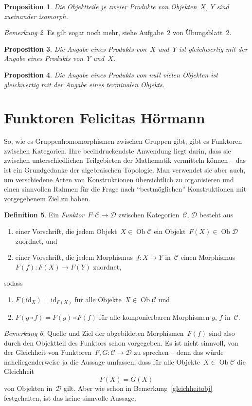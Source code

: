 \documentclass[a4paper,ngerman]{scrartcl}
\theoremstyle{definition}
\newtheorem{defn}{Definition}[section]
\theoremstyle{plain}
\newtheorem{prop}[defn]{Proposition}
\theoremstyle{remark}
\newtheorem{bem}[defn]{Bemerkung}
\newcommand{\C}{\mathcal{C}}
\newcommand{\D}{\mathcal{D}}
\newcommand{\id}{\mathrm{id}}
\DeclareMathOperator{\Ob}{Ob}
\begin{document}
\begin{prop}Die Objektteile je zweier Produkte von Objekten~$X$, $Y$ sind
zueinander isomorph.\end{prop}

\begin{bem}Es gilt sogar noch mehr, siehe Aufgabe~2 von Übungsblatt~2.\end{bem}

\begin{prop}Die Angabe eines Produkts von~$X$ und~$Y$ ist gleichwertig mit der
Angabe eines Produkts von~$Y$ und~$X$.\end{prop}

\begin{prop}Die Angabe eines Produkts von null vielen Objekten ist gleichwertig
mit der Angabe eines terminalen Objekts.\end{prop}


\section[Funktoren]{Funktoren \hfill \small Felicitas Hörmann}

So, wie es Gruppenhomomorphismen zwischen Gruppen gibt, gibt es Funktoren
zwischen Kategorien. Ihre beeindruckendste Anwendung liegt darin, dass sie
zwischen unterschiedlichen Teilgebieten der Mathematik vermitteln können -- das
ist ein Grundgedanke der algebraischen Topologie. Man verwendet sie aber auch,
um verschiedene Arten von Konstruktionen übersichtlich zu organisieren und
einen sinnvollen Rahmen für die Frage nach "`bestmöglichen"' Konstruktionen mit
vorgegebenem Ziel zu haben.

\begin{defn}Ein \emph{Funktor}~$F : \C \to \D$ zwischen Kategorien~$\C$, $\D$
besteht aus
\begin{enumerate}
\item einer Vorschrift, die jedem Objekt~$X \in \Ob \C$ ein Objekt~$F(X) \in \Ob \D$
zuordnet, und
\item einer Vorschrift, die jedem Morphismus~$f:X \to Y$ in~$\C$ einen
Morphismus~$F(f) : F(X) \to F(Y)$ zuordnet,
\end{enumerate}
sodass
\begin{enumerate}
\item $F(\id_X) = \id_{F(X)}$ für alle Objekte~$X \in \Ob \C$ und
\item $F(g \circ f) = F(g) \circ F(f)$ für alle komponierbaren Morphismen $g$, $f$
in~$\C$.
\end{enumerate}
\end{defn}
\begin{bem}Quelle und Ziel der abgebildeten Morphismen~$F(f)$ sind also durch
den Objektteil des Funktors schon vorgegeben. Es ist nicht sinnvoll, von der
Gleichheit von Funktoren~$F,G : \C \to \D$ zu sprechen -- denn das würde
naheliegenderweise ja die Aussage umfassen, dass für alle Objekte~$X \in \Ob \C$ die
Gleichheit
\[ F(X) = G(X) \]
von Objekten in~$\D$ gilt. Aber wie schon in Bemerkung~\ref{gleichheitobj}
festgehalten, ist das keine sinnvolle Aussage.
\end{bem}
\end{document}
